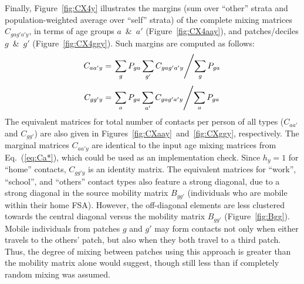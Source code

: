 \par
Finally, Figure~\ref{fig:CX4y} illustrates the margins
(sum over ``other'' strata and population-weighted average over ``self'' strata)
of the complete mixing matrices $C_{gag'a'y}$, in terms of
age groups $a$~\&~$a'$ (Figure~\ref{fig:CX4aay}), and
patches/deciles $g$~\&~$g'$ (Figure~\ref{fig:CX4ggy}).
Such margins are computed as follows:
\begin{equation}\label{eq:Caay}
  C_{aa'y} = \left.\sum_{g} P_{ga} \sum_{g'} C_{gag'a'y} \middle/ \sum_{g} P_{ga} \right.
\end{equation}
\begin{equation}\label{eq:Cggy}
  C_{gg'y} = \left.\sum_{a} P_{ga} \sum_{a'} C_{gag'a'y} \middle/ \sum_{a} P_{ga} \right.
\end{equation}
The equivalent matrices for total number of contacts per person of all types
($C_{aa'}$ and $C_{gg'}$) are also given in Figures~\ref{fig:CXaay}~and~\ref{fig:CXggy}, respectively.
The marginal matrices $C_{aa'y}$ are identical to the input age mixing matrices from Eq.~(\ref{eq:Ca*}),
which could be used as an implementation check.
Since $h_y = 1$ for ``home'' contacts, $C_{gg'y}$ is an identity matrix.
The equivalent matrices for ``work'', ``school'', and ``others'' contact types
also feature a strong diagonal, due to a strong diagonal in the source mobility matrix $B_{gg'}$
(individuals who are mobile within their home FSA).
However, the off-diagonal elements are less clustered towards the central diagonal
versus the mobility matrix $B_{gg'}$ (Figure~\ref{fig:Bgg}).
Mobile individuals from patches $g$ and $g'$ may form contacts
not only when either travels to the others' patch,
but also when they both travel to a third patch.
Thus, the degree of mixing between patches using this approach
is greater than the mobility matrix alone would suggest,
though still less than if completely random mixing was assumed.
